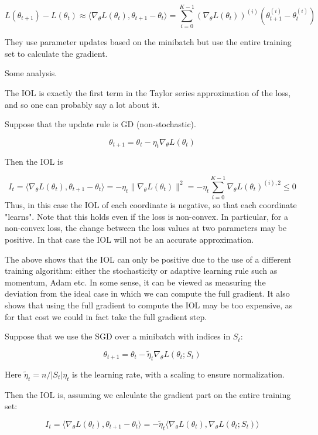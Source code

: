 \documentclass[english]{article}
\begin{document}
$$L(\theta_{t+1} ) - L(\theta_{t} ) \approx 
\langle\nabla_\theta L(\theta_{t} ), \theta_{t+1} - \theta_{t} 
\rangle
=
\sum_{i=0}^{K-1}
(\nabla_\theta L(\theta_{t} ))^{(i)} (\theta
^{(i)}_{t+1}
- \theta^{(i)}_t)
$$

They use parameter updates based on the minibatch but use the entire training set to
calculate the gradient.


Some analysis.

The IOL is exactly the first term in the Taylor series approximation of the loss, and so one can probably say a lot about it. 

Suppose that the update rule is GD (non-stochastic). 

$$\theta_{t+1} = \theta_{t} - \eta_t \nabla_\theta L(\theta_{t})$$

Then the IOL is 

$$I_t = 
\langle\nabla_\theta L(\theta_{t} ), \theta_{t+1} - \theta_{t} 
\rangle
=
- \eta_t 
\|\nabla_\theta L(\theta_{t} )\|^2
=
- \eta_t\sum_{i=0}^{K-1}
\nabla_\theta L(\theta_{t} )^{(i),2}\le 0
$$
Thus, in this case the IOL of each coordinate is negative, so that each coordinate "learns". Note that this holds even if the loss is non-convex. In particular, for a non-convex loss, the change between the loss values at two parameters may be positive. In that case the IOL will not be an accurate approximation.

The above shows that the IOL can only be positive due to the use of a different training algorithm: either the stochasticity or adaptive learning rule such as momentum, Adam etc. In some sense, it can be viewed as measuring the deviation from the ideal case in which we can compute the full gradient. It also shows that using the full gradient to compute the IOL may be too expensive, as for that cost we could in fact take the full gradient step. 


Suppose that we use the SGD over a minibatch with indices in $S_t$: 

$$\theta_{t+1} = \theta_{t} - \tilde\eta_t \nabla_\theta L(\theta_{t};S_t)$$

Here $\tilde\eta_t = n/|S_t|\eta_t$ is the learning rate, with a scaling to ensure normalization. 

Then the IOL is, assuming we calculate the gradient part on the entire training set: 

$$I_t = 
\langle\nabla_\theta L(\theta_{t} ), \theta_{t+1} - \theta_{t} 
\rangle
=
- \tilde\eta_t 
\langle\nabla_\theta L(\theta_{t} ), \nabla_\theta L(\theta_{t};S_t)
\rangle 
$$
\end{document}
